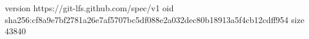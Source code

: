 version https://git-lfs.github.com/spec/v1
oid sha256:cf8a9e7bf2781a26e7af5707bc5df088e2a032dec80b18913a5f4cb12cdff954
size 43840

